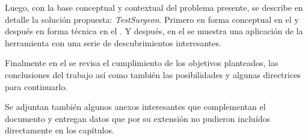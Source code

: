 \par Luego, con la base conceptual y contextual del problema presente, se describe en detalle la solución propuesta: \emph{TestSurgeon}. Primero en forma conceptual en el  y después en forma técnica en el . Y después, en el  se muestra una aplicación de la herramienta con una serie de descubrimientos interesantes. 

\par Finalmente en el  se revisa el cumplimiento de los objetivos planteados, las conclusiones del trabajo así como también las posibilidades y algunas directrices para continuarlo.

\par Se adjuntan también algunos anexos interesantes que complementan el documento y entregan datos que por su extensión no pudieron incluídos directamente en los capítulos.
